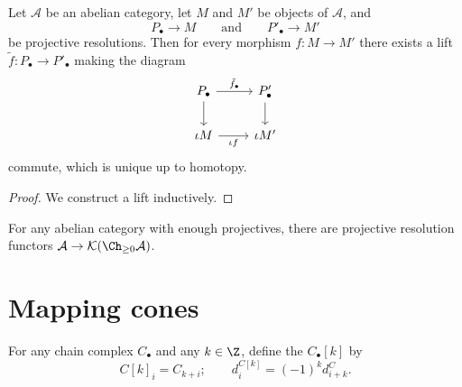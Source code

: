 \documentclass[main.tex]{subfiles}
\begin{document}
\begin{proposition}
  \label{prop:can_lift_morphisms_to_projective_resolutions}
  Let $\mathcal{A}$ be an abelian category, let $M$ and $M'$ be objects of $\mathcal{A}$, and
  \begin{equation*}
    P_{\bullet} \to M \qquad\text{and}\qquad P'_{\bullet} \to M'
  \end{equation*}
  be projective resolutions. Then for every morphism $f\colon M \to M'$ there exists a lift $\tilde{f}\colon P_{\bullet} \to P'_{\bullet}$ making the diagram
  \begin{equation*}
    \begin{tikzcd}
      P_{\bullet}
      \arrow[r, "\tilde{f}_{\bullet}"]
      \arrow[d]
      & P'_{\bullet}
      \arrow[d]
      \\
      \iota M
      \arrow[r, swap, "\iota f"]
      & \iota M'
    \end{tikzcd}
  \end{equation*}
  commute, which is unique up to homotopy.
\end{proposition}
\begin{proof}
  We construct a lift inductively.
\end{proof}

\begin{corollary}
  \label{cor:projective_resolution_functor}
  For any abelian category with enough projectives, there are projective resolution functors $\mathcal{A} \to \mathcal{K}(\Ch_{\geq 0}\mathcal{A})$.
\end{corollary}

\section{Mapping cones}
\label{sec:mapping_cones}

\begin{definition}
  \label{def:shift_functor}
  For any chain complex $C_{\bullet}$ and any $k \in \Z$, define the  $C_{\bullet}[k]$ by
  \begin{equation*}
    C[k]_{i} = C_{k+i};\qquad d^{C[k]}_{i} = (-1)^{k}d^{C}_{i+k}.
  \end{equation*}
\end{definition}
\end{document}
